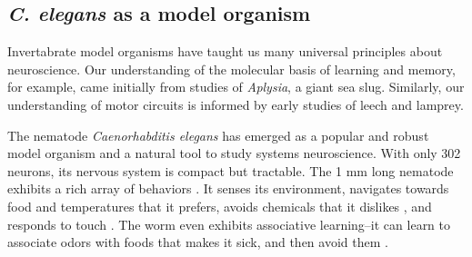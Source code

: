 


%







\subsection{\textit{C. elegans} as a model organism}
Invertabrate model organisms have taught us many universal principles about neuroscience.  Our understanding of the molecular basis of learning and memory, for example, came initially from studies of \textit{Aplysia}, a giant sea slug.  Similarly, our understanding of motor circuits is informed by early studies of leech and lamprey. 

The nematode \textit{Caenorhabditis elegans} has emerged as a popular and robust model organism and a natural tool to study systems neuroscience. With only 302 neurons, its nervous system is compact but tractable. The 1 mm long nematode exhibits a rich array of behaviors \citep{croll_components_1975}. It senses its environment,  navigates towards  food \cite{grewal_migration_1992}  and temperatures \cite{ryu_thermotaxis_2002} that it prefers,  avoids chemicals that it dislikes \citep{croll_behavoural_1975}, and responds to touch \citep{chalfie_neural_1985}. The worm even exhibits associative learning--it can learn to associate odors with foods that makes it sick, and then avoid them \citep{zhang_pathogenic_2005}. 

